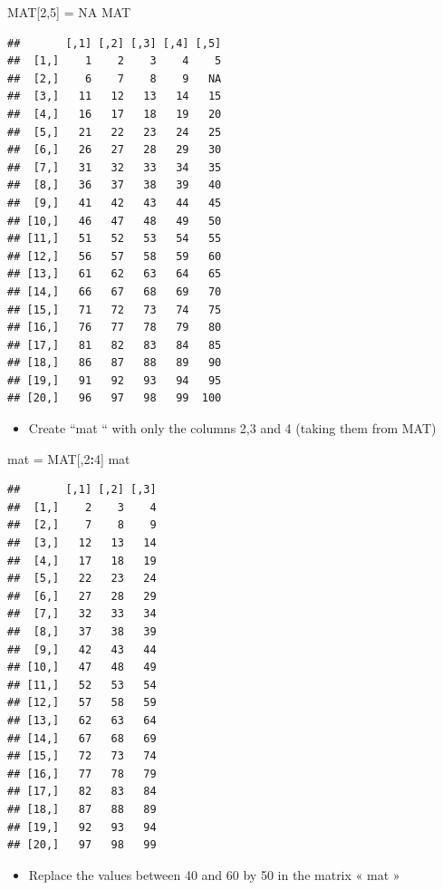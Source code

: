 \documentclass[]{article}
\newenvironment{Shaded}{\begin{snugshade}}{\end{snugshade}}
\newcommand{\DecValTok}[1]{\textcolor[rgb]{0.00,0.00,0.81}{#1}}
\newcommand{\StringTok}[1]{\textcolor[rgb]{0.31,0.60,0.02}{#1}}
\newcommand{\OtherTok}[1]{\textcolor[rgb]{0.56,0.35,0.01}{#1}}
\newcommand{\OperatorTok}[1]{\textcolor[rgb]{0.81,0.36,0.00}{\textbf{#1}}}
\newcommand{\NormalTok}[1]{#1}
\providecommand{\tightlist}{%
  \setlength{\itemsep}{0pt}\setlength{\parskip}{0pt}}
\begin{document}
\begin{Shaded}
\begin{Highlighting}[]
\NormalTok{MAT[}\DecValTok{2}\NormalTok{,}\DecValTok{5}\NormalTok{] =}\StringTok{ }\OtherTok{NA}
\NormalTok{MAT}
\end{Highlighting}
\end{Shaded}

\begin{verbatim}
##       [,1] [,2] [,3] [,4] [,5]
##  [1,]    1    2    3    4    5
##  [2,]    6    7    8    9   NA
##  [3,]   11   12   13   14   15
##  [4,]   16   17   18   19   20
##  [5,]   21   22   23   24   25
##  [6,]   26   27   28   29   30
##  [7,]   31   32   33   34   35
##  [8,]   36   37   38   39   40
##  [9,]   41   42   43   44   45
## [10,]   46   47   48   49   50
## [11,]   51   52   53   54   55
## [12,]   56   57   58   59   60
## [13,]   61   62   63   64   65
## [14,]   66   67   68   69   70
## [15,]   71   72   73   74   75
## [16,]   76   77   78   79   80
## [17,]   81   82   83   84   85
## [18,]   86   87   88   89   90
## [19,]   91   92   93   94   95
## [20,]   96   97   98   99  100
\end{verbatim}

\begin{itemize}
\tightlist
\item
  Create ``mat `` with only the columns 2,3 and 4 (taking them from MAT)
\end{itemize}

\begin{Shaded}
\begin{Highlighting}[]
\NormalTok{mat =}\StringTok{ }\NormalTok{MAT[,}\DecValTok{2}\OperatorTok{:}\DecValTok{4}\NormalTok{]}
\NormalTok{mat}
\end{Highlighting}
\end{Shaded}

\begin{verbatim}
##       [,1] [,2] [,3]
##  [1,]    2    3    4
##  [2,]    7    8    9
##  [3,]   12   13   14
##  [4,]   17   18   19
##  [5,]   22   23   24
##  [6,]   27   28   29
##  [7,]   32   33   34
##  [8,]   37   38   39
##  [9,]   42   43   44
## [10,]   47   48   49
## [11,]   52   53   54
## [12,]   57   58   59
## [13,]   62   63   64
## [14,]   67   68   69
## [15,]   72   73   74
## [16,]   77   78   79
## [17,]   82   83   84
## [18,]   87   88   89
## [19,]   92   93   94
## [20,]   97   98   99
\end{verbatim}

\begin{itemize}
\tightlist
\item
  Replace the values between 40 and 60 by 50 in the matrix « mat »
\end{itemize}
\end{document}
